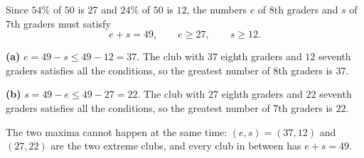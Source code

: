 Since $54\%$ of $50$ is $27$ and $24\%$ of $50$ is $12$, the numbers $e$ of 8th graders and $s$ of 7th graders must satisfy
\[e+s=49,\qquad e\ge27,\qquad s\ge12.\]

\textbf{(a)} $e=49-s\le49-12=37$. The club with $37$ eighth graders and $12$ seventh graders satisfies all the conditions, so the greatest number of 8th graders is $\boxed{37}$.

\textbf{(b)} $s=49-e\le49-27=22$. The club with $27$ eighth graders and $22$ seventh graders satisfies all the conditions, so the greatest number of 7th graders is $\boxed{22}$.

The two maxima cannot happen at the same time: $(e,s)=(37,12)$ and $(27,22)$ are the two extreme clubs, and every club in between has $e+s=49$.
